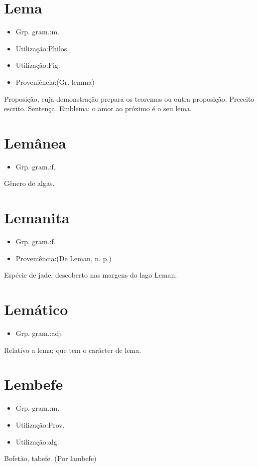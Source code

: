 \section{Lema}
\begin{itemize}
\item {Grp. gram.:m.}
\end{itemize}
\begin{itemize}
\item {Utilização:Philos.}
\end{itemize}
\begin{itemize}
\item {Utilização:Fig.}
\end{itemize}
\begin{itemize}
\item {Proveniência:(Gr. \textunderscore lemma\textunderscore )}
\end{itemize}
Proposição, cuja demonstração prepara os teoremas ou outra proposição.
Preceito escrito.
Sentença.
Emblema: \textunderscore o amor ao próximo é o seu lema\textunderscore .
\section{Lemânea}
\begin{itemize}
\item {Grp. gram.:f.}
\end{itemize}
Gênero de algas.
\section{Lemanita}
\begin{itemize}
\item {Grp. gram.:f.}
\end{itemize}
\begin{itemize}
\item {Proveniência:(De \textunderscore Leman\textunderscore , n. p.)}
\end{itemize}
Espécie de jade, descoberto nas margens do lago Leman.
\section{Lemático}
\begin{itemize}
\item {Grp. gram.:adj.}
\end{itemize}
Relativo a lema; que tem o carácter de lema.
\section{Lembefe}
\begin{itemize}
\item {Grp. gram.:m.}
\end{itemize}
\begin{itemize}
\item {Utilização:Prov.}
\end{itemize}
\begin{itemize}
\item {Utilização:alg.}
\end{itemize}
Bofetão, tabefe.
(Por \textunderscore lambefe\textunderscore )
